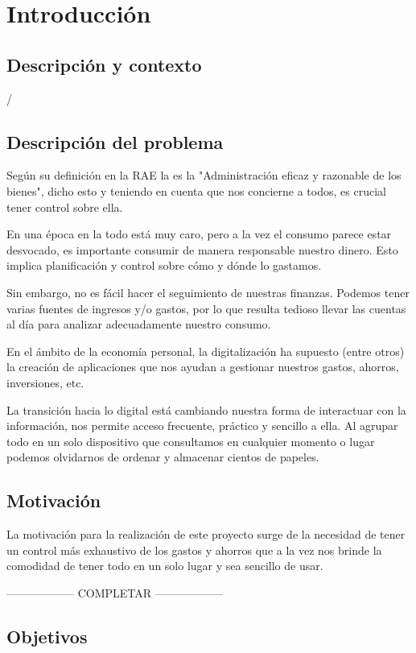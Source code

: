 \chapter{Introducción}
\section{Descripción y contexto} / \section{Descripción del problema}

Según su definición en la RAE la \cite{economía} es la 
"Administración eficaz y razonable de los bienes", dicho esto y teniendo en 
cuenta que nos concierne a todos, es crucial tener control sobre ella. 

En una época en la todo está muy caro, pero a la vez el consumo parece estar 
desvocado, es importante consumir de manera responsable nuestro dinero. Esto 
implica planificación y control sobre cómo y dónde lo gastamos.

Sin embargo, no es fácil hacer el seguimiento de nuestras finanzas. Podemos tener 
varias fuentes de ingresos y/o gastos, por lo que resulta tedioso 
llevar las cuentas al día para analizar adecuadamente nuestro consumo. 

En el ámbito de la economía personal, la digitalización ha supuesto (entre 
otros) la creación de aplicaciones que nos ayudan a gestionar nuestros 
gastos, ahorros, inversiones, etc.

La transición hacia lo digital está cambiando nuestra forma de interactuar con 
la información, nos permite acceso frecuente, práctico y sencillo a ella.
Al agrupar todo en un solo dispositivo que consultamos en cualquier momento o 
lugar podemos olvidarnos de ordenar y almacenar cientos de papeles.

\section{Motivación}
La motivación para la realización de este proyecto surge de la necesidad de 
tener un control más exhaustivo de los gastos y ahorros que a la vez nos brinde 
la comodidad de tener todo en un solo lugar y sea sencillo de usar.

------------------ COMPLETAR ------------------


\section{Objetivos} \label{sect:goals}
